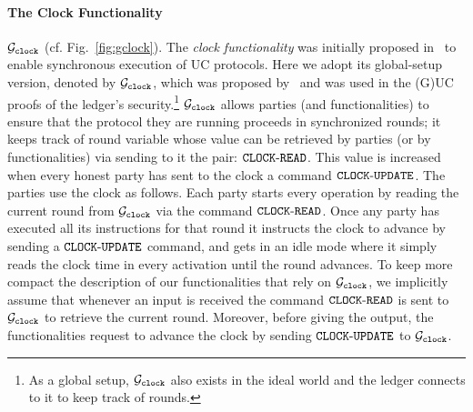 \paragraph{The Clock Functionality} $\mathcal{G}_{\mathtt{clock}}$ (cf. Fig.~\ref{fig:gclock}).
The \emph{clock functionality}  was initially proposed in~\cite{TCC:KMTZ13} to enable synchronous execution of UC protocols. Here we adopt its global-setup version, denoted by $\mathcal{G}_{\mathtt{clock}}$, which was proposed by~\cite{C:BMTZ17} and was used in the (G)UC proofs of the ledger's security.\footnote{As a global setup, $\mathcal{G}_{\mathtt{clock}}$ also exists in the ideal world and the ledger connects to it to keep track of rounds.}  $\mathcal{G}_{\mathtt{clock}}$  allows  parties (and functionalities) to ensure that the protocol they are running proceeds in synchronized rounds; it keeps track of  round variable whose value can be retrieved by parties (or by functionalities) via sending to it the pair: $\mathtt{CLOCK\text{-}READ}$. This value is increased when every honest party has sent to the clock a command $\mathtt{CLOCK\text{-}UPDATE}$.
The parties use the clock as follows.  Each party starts every operation by reading the current round from $\mathcal{G}_{\mathtt{clock}}$ via the command $\mathtt{CLOCK\text{-}READ}$. Once any party  has executed all its instructions
for that round it instructs the clock to advance by sending a $\mathtt{CLOCK\text{-}UPDATE}$ command, and gets in an idle mode where it simply reads the clock time in every activation until the round advances. %
To keep more compact the description of our functionalities that rely on $\mathcal{G}_{\mathtt{clock}}$, we implicitly assume that
whenever an input is received the command $\mathtt{CLOCK\text{-}READ}$ is sent to $\mathcal{G}_{\mathtt{clock}}$ to retrieve the current round. Moreover, before giving the output, the functionalities request to advance the clock by sending $\mathtt{CLOCK\text{-}UPDATE}$ to $\mathcal{G}_{\mathtt{clock}}$.






